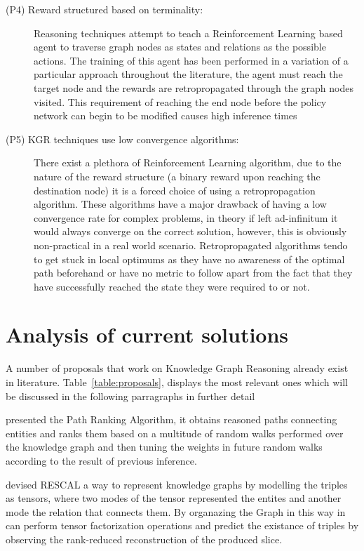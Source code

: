\begin{description}
    \item[(P4) Reward structured based on terminality:] Reasoning techniques attempt to teach a Reinforcement Learning based agent to traverse graph nodes as states and relations as the possible actions. The training of this agent has been performed in a variation of a particular approach throughout the literature, the agent must reach the target node and the rewards are retropropagated through the graph nodes visited. This requirement of reaching the end node before the policy network can begin to be modified causes high inference times \\
    
    \item[(P5) KGR techniques use low convergence algorithms:] There exist a plethora of Reinforcement Learning algorithm, due to the nature of the reward structure (a binary reward upon reaching the destination node) it is a forced choice of using a retropropagation algorithm. These algorithms have a major drawback of having a low convergence rate for complex problems, in theory if left ad-infinitum it would always converge on the correct solution, however, this is obviously non-practical in a real world scenario. Retropropagated algorithms tendo to get stuck in local optimums as they have no awareness of the optimal path beforehand or have no metric to follow apart from the fact that they have successfully reached the state they were required to or not.
\end{description}

\section{Analysis of current solutions}\label{sec:moti-analysis}

A number of proposals that work on Knowledge Graph Reasoning already exist in literature. Table~\ref{table:proposals}, displays the most relevant ones which will be discussed in the following parragraphs in further detail



\citet{lao2011random} presented the Path Ranking Algorithm, it obtains reasoned paths connecting entities and ranks them based on a multitude of random walks performed over the knowledge graph and then tuning the weights in future random walks according to the result of previous inference.

\citet{nickel2011three} devised RESCAL a way to represent knowledge graphs by modelling the triples as tensors, where two modes of the tensor represented the entites and another mode the relation that connects them. By organazing the Graph in this way in can perform tensor factorization operations and predict the existance of triples by observing the rank-reduced reconstruction of the produced slice.

